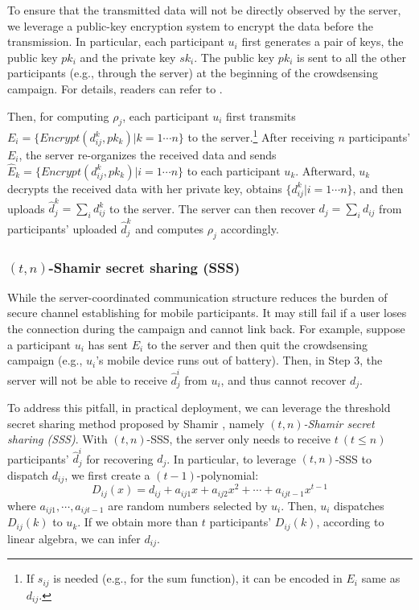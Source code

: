 To ensure that the transmitted data will not be directly observed by the server, we leverage a public-key encryption system to encrypt the data before the transmission. In particular, each participant $u_i$ first generates a pair of keys, the public key $pk_i$ and the private key $sk_i$. The public key $pk_i$ is sent to all the other participants (e.g., through the server) at the beginning of the crowdsensing campaign. For details, readers can refer to \citet{Bonawitz2017PracticalSA}.

Then, for computing $\rho_j$, each participant $u_i$ first transmits $E_i = \{\textit{Encrypt}(d_{ij}^k, pk_k)| k = 1\cdots n\}$ to the server.\footnote{If $s_{ij}$ is needed (e.g., for the sum function), it can be encoded in $E_i$ same as $d_{ij}$.} After receiving $n$ participants' $E_i$, the server re-organizes the received data and sends $\hat E_k = \{\textit{Encrypt}(d_{ij}^k, pk_k)| i = 1\cdots n\}$ to each participant $u_k$. Afterward, $u_k$ decrypts the received data with her private key, obtains $\{d_{ij}^k| i = 1 \cdots n\}$, and then uploads $\hat d_j^k = \sum_i d_{ij}^k$ to the server. The server can then recover $d_j = \sum_i d_{ij}$ from participants' uploaded  $\hat d_j^k$ and computes $\rho_j$ accordingly.

\subsubsection{$(t,n)$-Shamir secret sharing (SSS)} While the server-coordinated communication structure reduces the burden of secure channel establishing for mobile participants. It may still fail if a user loses the connection during the campaign and cannot link back. For example, suppose a participant $u_i$ has sent $E_i$ to the server and then quit the crowdsensing campaign (e.g., $u_i$'s mobile device runs out of battery). Then, in Step 3, the server will not be able to receive $\hat d_j^i$ from $u_i$, and thus cannot recover $d_j$.

To address this pitfall, in practical deployment, we can leverage the threshold secret sharing method proposed by Shamir \citep{shamir1979share}, namely \textit{$(t,n)$-Shamir secret sharing (SSS)}. With $(t,n)$-SSS, the server only needs to receive $t\ (t\le n)$ participants' $\hat d_j^i$ for recovering $d_j$. In particular, to leverage $(t,n)$-SSS to dispatch $d_{ij}$, we first create a $(t-1)$-polynomial:
\begin{equation}
	D_{ij}(x) = d_{ij}+a_{ij1}x+a_{ij2}x^2+\cdots+a_{ijt-1}x^{t-1}
\end{equation}
where $a_{ij1},\cdots, a_{ijt-1}$ are random numbers selected by $u_i$. Then, $u_i$ dispatches $D_{ij}(k)$ to $u_k$. If we obtain more than $t$ participants' $D_{ij}(k)$, according to linear algebra, we can infer $d_{ij}$.

